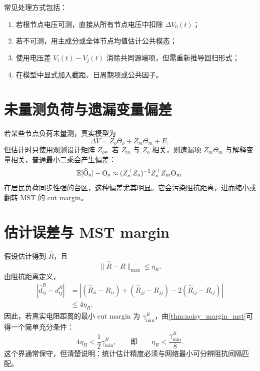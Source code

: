 常见处理方式包括：
\begin{enumerate}[label=(\arabic*)]
  \item 若根节点电压可测，直接从所有节点电压中扣除 $\Delta V_0(t)$；
  \item 若不可测，用主成分或全体节点均值估计公共模态；
  \item 使用电压差 $V_i(t)-V_j(t)$ 消除共同源端项，但需重新推导回归形式；
  \item 在模型中显式加入截距、日周期项或公共因子。
\end{enumerate}

\section{未量测负荷与遗漏变量偏差}

若某些节点负荷未量测，真实模型为
\begin{equation}
  \Delta V = Z_o\Theta_o + Z_m\Theta_m + E,
\end{equation}
但估计时只使用观测设计矩阵 $Z_o$。若 $Z_m$ 与 $Z_o$ 相关，则遗漏项 $Z_m\Theta_m$ 与解释变量相关，普通最小二乘会产生偏差：
\begin{equation}
  \mathbb{E}[\widehat\Theta_o]-\Theta_o
  \approx (Z_o^\top Z_o)^{-1}Z_o^\top Z_m\Theta_m.
\end{equation}
在居民负荷同步性强的台区，这种偏差尤其明显。它会污染阻抗距离，进而缩小或翻转 MST 的 cut margin。

\section{估计误差与 MST margin}

假设估计得到 $\widehat R$，且
\begin{equation}
  \|\widehat R-R\|_{\max}\le \eta_R .
\end{equation}
由阻抗距离定义，
\begin{align}
  |\widehat d^R_{ij}-d^R_{ij}|
  &=
  |(\widehat R_{ii}-R_{ii})+(\widehat R_{jj}-R_{jj})
  -2(\widehat R_{ij}-R_{ij})|\\
  &\le 4\eta_R .
\end{align}
因此，若真实电阻距离的最小 cut margin 为 $\gamma_{\min}^R$，由\cref{thm:noisy_margin_mst}可得一个简单充分条件：
\begin{equation}
  4\eta_R < \frac{1}{2}\gamma_{\min}^R,
  \qquad\text{即}\qquad
  \eta_R<\frac{\gamma_{\min}^R}{8}.
\end{equation}
这个界通常保守，但清楚说明：统计估计精度必须与网络最小可分辨阻抗间隔匹配。

